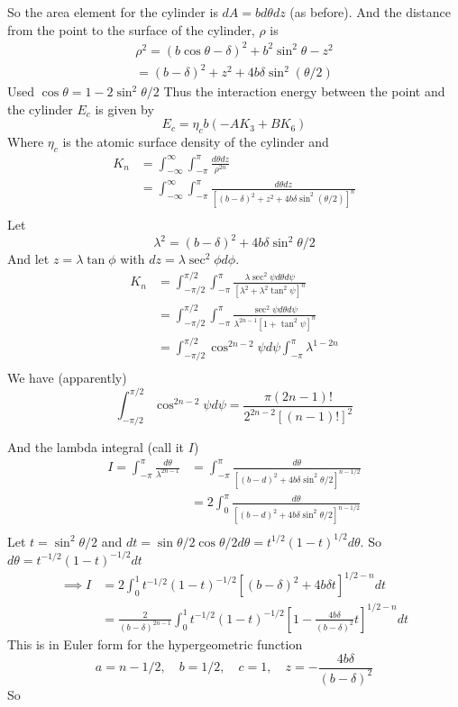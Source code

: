 \documentclass{X:/Documents/Coding/Latex/myassignment}
\begin{document}
So the area element for the cylinder is $dA = b d\theta dz$ (as before). And the distance from the point to the surface of the cylinder, $\rho$ is 
\begin{align*}
	\rho^2 = (b\cos\theta - \delta)^2 + b^2 \sin^2 \theta -z^2\\
	= (b- \delta)^2 + z^2 + 4b \delta \sin^2(\theta/2)
\end{align*}
Used $\cos\theta = 1-2\sin^2\theta/2$
Thus the interaction energy between the point and the cylinder $E_c$ is given by
\[E_c = \eta_c b(-AK_3 + BK_6)\]
Where $\eta_c$ is the atomic surface density of the cylinder and 
\begin{align*}
	K_n &= \int_{-\infty}^{\infty} \int_{-\pi}^{\pi} \frac{d\theta dz}{\rho^{2n}}\\
	&= \int_{-\infty}^{\infty} \int_{-\pi}^{\pi} \frac{d\theta dz}{\left[(b- \delta)^2 + z^2 + 4b \delta \sin^2(\theta/2)\right]^{n}}\\
\end{align*}
Let 
\[\lambda^2 = (b- \delta)^2 + 4b \delta \sin^2 \theta/2\]
And let $z = \lambda \tan \phi$ with $dz = \lambda \sec^2\phi d\phi$.
\begin{align*}
	K_n &= \int_{-\pi/2}^{\pi/2} \int_{-\pi}^{\pi} \frac{\lambda \sec^2 \psi d\theta d\psi}{\left[\lambda^2 + \lambda^2 \tan^2 \psi\right]^n}\\
	&= \int_{-\pi/2}^{\pi/2} \int_{-\pi}^{\pi} \frac{\sec^2 \psi d\theta d\psi}{\lambda^{2n-1}\left[1 + \tan^2 \psi\right]^n}\\
	&= \int_{-\pi/2}^{\pi/2} \cos^{2n-2} \psi d\psi \int_{-\pi}^{\pi} \lambda^{1-2n}\\
\end{align*}
We have (apparently)
\[\int_{-\pi/2}^{\pi/2} \cos^{2n-2} \psi d\psi = \frac{\pi (2n-1)!}{2^{2n-2} [(n-1)!]^2}\]

And the lambda integral (call it $I$)
\begin{align*}
	I = \int_{-\pi}^{\pi} \frac{d\theta}{\lambda^{2n-1}} &= \int_{-\pi}^{\pi} \frac{d\theta}{\left[(b-d)^2 + 4b \delta\sin^2\theta/2\right]^{n-1/2}}\\
	&= 2\int_{0}^{\pi} \frac{d\theta}{\left[(b-d)^2 + 4b \delta\sin^2\theta/2\right]^{n-1/2}}\\
\end{align*}
Let $t = \sin^2\theta/2$ and $dt = \sin\theta/2 \cos\theta/2 d\theta = t^{1/2} (1-t)^{1/2} d\theta$. So $d\theta = t^{-1/2} (1-t)^{-1/2} dt$
\begin{align*}
	\implies I &= 2\int_0^1 t^{-1/2} (1-t)^{-1/2} \left[(b -\delta)^2 + 4b \delta t\right]^{1/2 - n} dt\\
	&= \frac{2}{(b- \delta)^{2n-1}} \int_0^1 t^{-1/2} (1-t)^{-1/2} \left[1 - \frac{4b \delta}{(b- \delta)^2} t \right]^{1/2-n} dt
\end{align*}
This is in Euler form for the hypergeometric function
\[a = n-1/2, \quad b = 1/2, \quad c = 1, \quad z = -\frac{4b \delta}{(b- \delta)^2}\]
So
\end{document}
